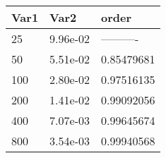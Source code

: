 \begin{tabular}{lll}
Var1 & Var2 & order \\ 
\hline 
25 & 9.96e-02 & ---------- \\ 
50 & 5.51e-02 & 0.85479681 \\ 
100 & 2.80e-02 & 0.97516135 \\ 
200 & 1.41e-02 & 0.99092056 \\ 
400 & 7.07e-03 & 0.99645674 \\ 
800 & 3.54e-03 & 0.99940568 \\ 
\hline 
\end{tabular}